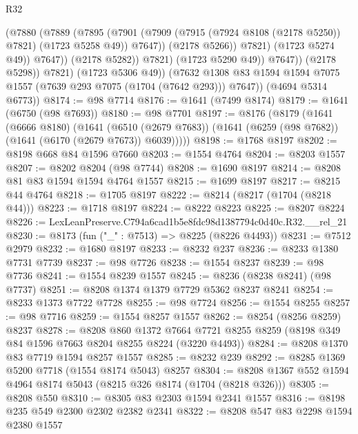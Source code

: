 \begin{lexlean}{R32}
\begin{coremodule}
                              (@7880
                                (@7889
                                  (@7895
                                    (@7901
                                      (@7909
                                        (@7915 (@7924 @8108 (@2178 @5250)) @7821)
                                        (@1723 @5258 @49))
                                      @7647))
                                  (@2178 @5266))
                                @7821)
                              (@1723 @5274 @49))
                            @7647))
                        (@2178 @5282))
                      @7821)
                    (@1723 @5290 @49))
                  @7647))
              (@2178 @5298))
            @7821)
          (@1723 @5306 @49))
        (@7632 @1308 @83 @1594 @1594 @7075 @1557 (@7639 @293 @7075 (@1704 (@7642 @293))) @7647))
      (@4694 @5314 @6773))
@8174 := @98 @7714
@8176 := @1641 (@7499 @8174)
@8179 := @1641 (@6750 (@98 @7693))
@8180 := @98 @7701
@8197 := @8176
    (@8179
      (@1641
        (@6666 @8180)
        (@1641
          (@6510 (@2679 @7683))
          (@1641 (@6259 (@98 @7682)) (@1641 (@6170 (@2679 @7673)) @6039)))))
@8198 := @1768 @8197
@8202 := @8198 @668 @84 @1596 @7660
@8203 := @1554 @4764
@8204 := @8203 @1557
@8207 := @8202 @8204 (@98 @7744)
@8208 := @1690 @8197
@8214 := @8208 @81 @83 @1594 @1594 @4764 @1557
@8215 := @1699 @8197
@8217 := @8215 @44 @4764
@8218 := @1705 @8197
@8222 := @8214 (@8217 (@1704 (@8218 @44)))
@8223 := @1718 @8197
@8224 := @8222 @8223
@8225 := @8207 @8224
@8226 := LexLeanPreserve.C794a6cad1b5e8fdc98d1387794c0d40c.R32.__rel_21
@8230 := @8173 (fun ("_" : @7513) => @8225 (@8226 @4493))
@8231 := @7512 @2979
@8232 := @1680 @8197
@8233 := @8232 @237
@8236 := @8233 @1380 @7731 @7739
@8237 := @98 @7726
@8238 := @1554 @8237
@8239 := @98 @7736
@8241 := @1554 @8239 @1557
@8245 := @8236 (@8238 @8241) (@98 @7737)
@8251 := @8208 @1374 @1379 @7729 @5362 @8237 @8241
@8254 := @8233 @1373 @7722 @7728
@8255 := @98 @7724
@8256 := @1554 @8255
@8257 := @98 @7716
@8259 := @1554 @8257 @1557
@8262 := @8254 (@8256 @8259) @8237
@8278 := @8208
    @860
    @1372
    @7664
    @7721
    @8255
    @8259
    (@8198 @349 @84 @1596 @7663 @8204 @8255 @8224 (@3220 @4493))
@8284 := @8208 @1370 @83 @7719 @1594 @8257 @1557
@8285 := @8232 @239
@8292 := @8285 @1369 @5200 @7718 (@1554 @8174 @5043) @8257
@8304 := @8208 @1367 @552 @1594 @4964 @8174 @5043 (@8215 @326 @8174 (@1704 (@8218 @326)))
@8305 := @8208 @550
@8310 := @8305 @83 @2303 @1594 @2341 @1557
@8316 := @8198 @235 @549 @2300 @2302 @2382 @2341
@8322 := @8208 @547 @83 @2298 @1594 @2380 @1557

\end{coremodule}
\end{lexlean}
